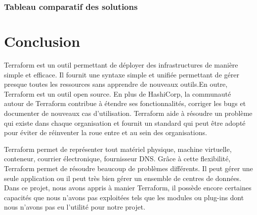 \documentclass[]{article}
\begin{document}
\subsubsection{Tableau comparatif des solutions}

\newpage
\section{Conclusion}\label{conclusion}
Terraform est un outil permettant de déployer des
infrastructures de manière simple et efficace. Il fournit une syntaxe
simple et unifiée permettant de gérer presque toutes les ressources sans
apprendre de nouveaux outils.En outre, Terraform est un outil open
source. En plus de HashiCorp, la communauté autour de Terraform
contribue à étendre ses fonctionnalités, corriger les bugs et documenter
de nouveaux cas d'utilisation. Terraform aide à résoudre un problème qui
existe dans chaque organisation et fournit un standard qui peut être
adopté pour éviter de réinventer la roue entre et au sein des
organisations.

Terraform permet de représenter tout matériel physique, machine virtuelle, conteneur, courrier électronique, fournisseur DNS. Grâce à cette flexibilité, Terraform permet de résoudre beaucoup de problèmes différents. Il peut gérer une seule application ou il peut très bien gérer un ensemble de centres de données. Dans ce projet, nous avons appris à manier Terraform, il possède encore certaines capacités que nous n'avons pas exploitées tels que les modules ou plug-ins dont nous n'avons pas eu l'utilité pour notre projet.
\end{document}
